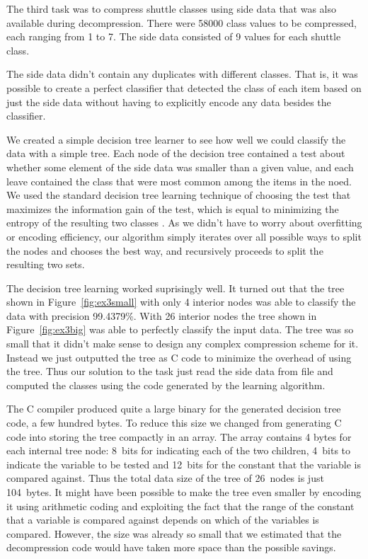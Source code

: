 \documentclass{article}
\begin{document}
The third task was to compress shuttle classes using side data that was also available during decompression.
There were 58000 class values to be compressed, each ranging from 1 to 7.
The side data consisted of 9 values for each shuttle class.

The side data didn't contain any duplicates with different classes.
That is, it was possible to create a perfect classifier that detected the class of each item based on just the side data without having to explicitly encode any data besides the classifier.

We created a simple decision tree learner to see how well we could classify the data with a simple tree.
Each node of the decision tree contained a test about whether some element of the side data was smaller than a given value, and each leave contained the class that were most common among the items in the noed.
We used the standard decision tree learning technique of choosing the test that maximizes the information gain of the test, which is equal to minimizing the entropy of the resulting two classes \cite{aima}.
As we didn't have to worry about overfitting or encoding efficiency, our algorithm simply iterates over all possible ways to split the nodes and chooses the best way, and recursively proceeds to split the resulting two sets.

The decision tree learning worked suprisingly well.
It turned out that the tree shown in Figure~\ref{fig:ex3small} with only 4 interior nodes was able to classify the data with precision 99.4379\%.
With 26 interior nodes the tree shown in Figure~\ref{fig:ex3big} was able to perfectly classify the input data.
The tree was so small that it didn't make sense to design any complex compression scheme for it.
Instead we just outputted the tree as C code to minimize the overhead of using the tree.
Thus our solution to the task just read the side data from file and computed the classes using the code generated by the learning algorithm.

The C compiler produced quite a large binary for the generated decision tree code, a few hundred bytes.
To reduce this size we changed from generating C code into storing the tree compactly in an array.
The array contains 4 bytes for each internal tree node: 8~bits for indicating each of the two children, 4~bits to indicate the variable to be tested and 12~bits for the constant that the variable is compared against.
Thus the total data size of the tree of 26~nodes is just 104~bytes.
It might have been possible to make the tree even smaller by encoding it using arithmetic coding and exploiting the fact that the range of the constant that a variable is compared against depends on which of the variables is compared.
However, the size was already so small that we estimated that the decompression code would have taken more space than the possible savings.
\end{document}
